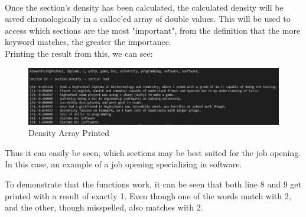 \\
Once the section's density has been calculated, the calculated density will be saved chronologically in a calloc'ed array of double values. 
This will be used to access which sections are the most "important", from the definition that the more keyword matches, the greater the importance.
\\
Printing the result from this, we can see:
\begin{figure}[H]
  \centering
  \includegraphics[scale = 0.6]{figures/density_example.png}
  \caption{Density Array Printed}
\end{figure}
Thus it can easily be seen, which sections may be best suited for the job opening. 
In this case, an example of a job opening specializing in software.

To demonstrate that the functions work, it can be seen that both line 8 and 9 get printed with a result of exactly 1.
Even though one of the words match with 2, and the other, though misspelled, also matches with 2.

